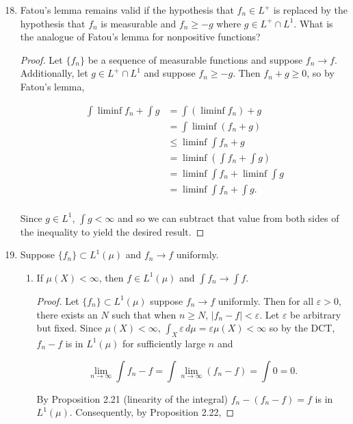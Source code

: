 \documentclass[11pt,oneside,english]{amsart}
\theoremstyle{definition}
\newcommand{\lom}[2]{\lim_{{#1}\rightarrow{#2}}}
\newcommand{\ve}{\varepsilon}
\begin{document}
\vspace{5mm}
\begin{enumerate}
\setcounter{enumi}{17}

\item Fatou's lemma remains valid if the hypothesis that $f_n\in L^+$ is replaced by the hypothesis that $f_n$ is measurable and $f_n\geq -g$ where $g\in L^+\cap L^1$. What is the analogue of Fatou's lemma for nonpositive functions?

\begin{proof}
Let $\{f_n\}$ be a sequence of measurable functions and suppose $f_n\rightarrow f$. Additionally, let $g\in L^+\cap L^1$ and suppose $f_n\geq -g$. Then $f_n+g\geq0$, so by Fatou's lemma,

\begin{align*}
\int\liminf f_n+\int g&=\int(\liminf f_n) +g\\[2mm]
&=\int\liminf(f_n+g)\\[2mm]
&\leq\liminf\int f_n+g\\[2mm]
&=\liminf \left(\int f_n +\int g\right)\\[2mm]
&=\liminf\int f_n +\liminf \int g\\[2mm]
&=\liminf\int f_n +\int g.\\[2mm]
\end{align*}

Since $g\in L^1$, $\int g<\infty$ and so we can subtract that value from both sides of the inequality to yield the desired result.
\end{proof}

\item Suppose $\{f_n\}\subset L^1(\mu)$ and $f_n\rightarrow f$ uniformly.

\begin{enumerate}
\item If $\mu(X)<\infty$, then $f\in L^1(\mu)$ and $\int f_n\rightarrow \int f$.

\begin{proof}
Let $\{f_n\}\subset L^1(\mu)$ suppose $f_n\rightarrow f$ uniformly. Then for all $\ve>0$, there exists an $N$ such that when $n\geq N$, $|f_n-f|<\ve$. Let $\ve$ be arbitrary but fixed. Since $\mu(X)<\infty$, $\int_X\ve\,d\mu=\ve\mu(X)<\infty$ so by the DCT, $f_n-f$ is in $L^1(\mu)$ for sufficiently large $n$ and 

\[
\lom{n}{\infty}\int f_n-f=\int \lom{n}{\infty}(f_n-f)=\int0=0.
\]

By Proposition 2.21 (linearity of the integral) $f_n-(f_n-f)=f$ is in $L^1(\mu)$. Consequently, by Proposition 2.22,


\end{proof}
\end{enumerate}
\end{enumerate}
\end{document}
